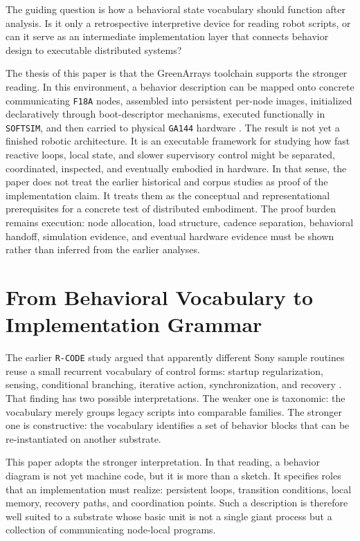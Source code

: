 \documentclass[11pt]{article}
\begin{document}
The guiding question is how a behavioral state vocabulary should function
after analysis. Is it only a retrospective interpretive device for reading
robot scripts, or can it serve as an intermediate implementation layer that
connects behavior design to executable distributed systems?

The thesis of this paper is that the GreenArrays toolchain supports the
stronger reading. In this environment, a behavior description can be mapped
onto concrete communicating \texttt{F18A} nodes, assembled into persistent
per-node images, initialized declaratively through boot-descriptor
mechanisms, executed functionally in \texttt{SOFTSIM}, and then carried to
physical \texttt{GA144} hardware \citep{greenarrays2011db001,greenarrays2011db013}. The
result is not yet a finished robotic architecture. It is an executable
framework for studying how fast reactive loops, local state, and slower
supervisory control might be separated, coordinated, inspected, and
eventually embodied in hardware. In that sense, the paper does not treat
the earlier historical and corpus studies as proof of the implementation
claim. It treats them as the conceptual and representational prerequisites
for a concrete test of distributed embodiment. The proof burden remains
execution: node allocation, load structure, cadence separation, behavioral
handoff, simulation evidence, and eventual hardware evidence must be shown
rather than inferred from the earlier analyses.

\section{From Behavioral Vocabulary to Implementation Grammar}

The earlier \texttt{R-CODE} study argued that apparently different Sony
sample routines reuse a small recurrent vocabulary of control forms:
startup regularization, sensing, conditional branching, iterative action,
synchronization, and recovery \citep{tucker2026behavioral}. That finding
has two possible interpretations. The weaker one is taxonomic: the
vocabulary merely groups legacy scripts into comparable families. The
stronger one is constructive: the vocabulary identifies a set of behavior
blocks that can be re-instantiated on another substrate.

This paper adopts the stronger interpretation. In that reading, a behavior
diagram is not yet machine code, but it is more than a sketch. It specifies
roles that an implementation must realize: persistent loops, transition
conditions, local memory, recovery paths, and coordination points. Such a
description is therefore well suited to a substrate whose basic unit is not
a single giant process but a collection of communicating node-local
programs.
\end{document}
